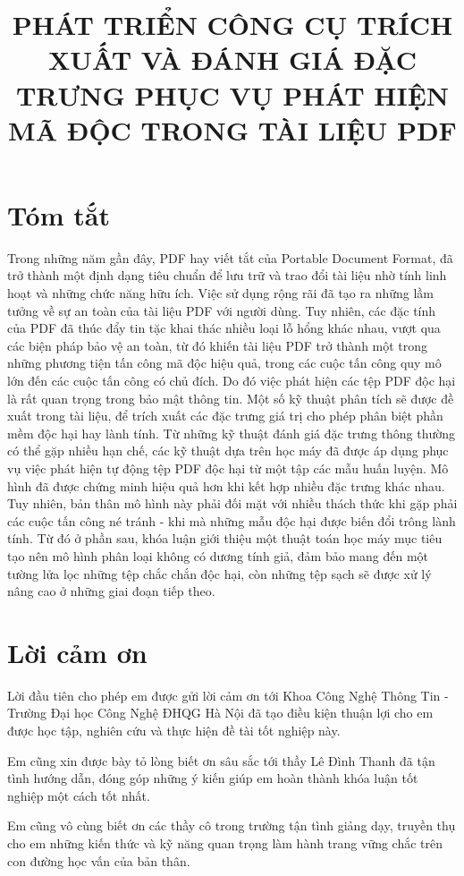 \documentclass[12pt,a4paper]{report}
\title{PHÁT TRIỂN CÔNG CỤ TRÍCH XUẤT VÀ ĐÁNH GIÁ ĐẶC TRƯNG PHỤC VỤ PHÁT HIỆN MÃ ĐỘC TRONG TÀI LIỆU PDF}
\begin{document}

\clearpage{}

\chapter*{Tóm tắt}

Trong những năm gần đây, PDF hay viết tắt của Portable Document Format, đã trở thành một định dạng tiêu chuẩn để lưu trữ và trao đổi tài liệu nhờ tính linh hoạt và những chức năng hữu ích. Việc sử dụng rộng rãi đã tạo ra những lầm tưởng về sự an toàn của tài liệu PDF với người dùng. Tuy nhiên, các đặc tính của PDF đã thúc đẩy tin tặc khai thác nhiều loại lỗ hổng khác nhau, vượt qua các biện pháp bảo vệ an toàn, từ đó khiến tài liệu PDF trở thành một trong những phương tiện tấn công mã độc hiệu quả, trong các cuộc tấn công quy mô lớn đến các cuộc tấn công có chủ đích. Do đó việc phát hiện các tệp PDF độc hại là rất quan trọng trong bảo mật thông tin. Một số kỹ thuật phân tích sẽ được đề xuất trong tài liệu, để trích xuất các đặc trưng giá trị cho phép phân biệt phần mềm độc hại hay lành tính. Từ những kỹ thuật đánh giá đặc trưng thông thường có thể gặp nhiều hạn chế, các kỹ thuật dựa trên học máy đã được áp dụng phục vụ việc phát hiện tự động tệp PDF độc hại từ một tập các mẫu huấn luyện. Mô hình đã được chứng minh hiệu quả hơn khi kết hợp nhiều đặc trưng khác nhau. Tuy nhiên, bản thân mô hình này phải đối mặt với nhiều thách thức khi gặp phải các cuộc tấn công né tránh - khi mà những mẫu độc hại được biến đổi trông lành tính. Từ đó ở phần sau, khóa luận giới thiệu một thuật toán học máy mục tiêu tạo nên mô hình phân loại không có dương tính giả, đảm bảo mang đến một tường lửa lọc những tệp chắc chắn độc hại, còn những tệp sạch sẽ được xử lý nâng cao ở những giai đoạn tiếp theo.


\chapter*{Lời cảm ơn}


Lời đầu tiên cho phép em được gửi lời cảm ơn tới Khoa Công Nghệ Thông Tin - Trường Đại học Công
Nghệ ĐHQG Hà Nội đã tạo điều kiện thuận lợi cho em được học tập, nghiên cứu và thực hiện
đề tài tốt nghiệp này.

Em cũng xin được bày tỏ lòng biết ơn sâu sắc tới thầy Lê Đình Thanh đã tận tình hướng dẫn,
đóng góp những ý kiến giúp em hoàn thành khóa luận tốt nghiệp một cách tốt nhất.

Em cũng vô cùng biết ơn các thầy cô trong trường tận tình giảng dạy, truyền thụ cho
em những kiến thức và kỹ năng quan trọng làm hành trang vững chắc trên con đường học vấn
của bản thân.
\end{document}
